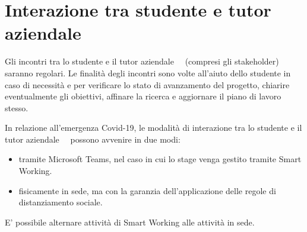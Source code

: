 \section*{Interazione tra studente e tutor aziendale}

Gli incontri tra lo studente e il tutor aziendale \nomeTutorAziendale\ \cognomeTutorAziendale\ (compresi gli stakeholder) saranno regolari. Le finalità degli incontri sono volte all'aiuto dello studente in caso di necessità e per verificare lo stato di avanzamento del progetto, chiarire eventualmente gli obiettivi, affinare la ricerca e aggiornare il piano di lavoro stesso.

In relazione all'emergenza Covid-19, le modalità di interazione tra lo studente e il tutor aziendale \nomeTutorAziendale\ \cognomeTutorAziendale\ possono avvenire in due modi:
\begin{itemize}
    \item tramite Microsoft Teams, nel caso in cui lo stage venga gestito tramite Smart Working.
    \item fisicamente in sede, ma con la garanzia dell'applicazione delle regole di distanziamento sociale.
\end{itemize}
E' possibile alternare attività di Smart Working alle attività in sede.

\newpage
